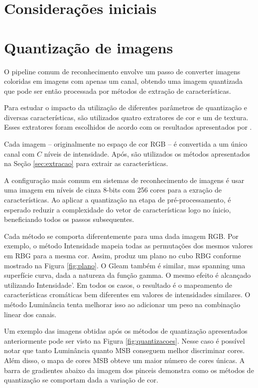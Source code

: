 \section{Considerações iniciais}


\section{Quantização de imagens}

O pipeline comum de reconhecimento envolve um passo de converter imagens coloridas em imagens com apenas um canal, obtendo uma imagem quantizada que pode ser então processada por métodos de extração de características.

Para estudar o impacto da utilização de diferentes parâmetros de quantização e diversas características, são utilizados quatro extratores de cor e um de textura. Esses extratores foram escolhidos de acordo com os resultados apresentados por .

Cada imagem -- originalmente no espaço de cor RGB -- é convertida a um único canal com $C$ níveis de intensidade. Após, são utilizados os métodos apresentados na Seção \ref{sec:extracao} para extrair as características.

A configuração mais comum em sistemas de reconhecimento de imagens é usar uma imagem em níveis de cinza 8-bits com 256 cores para a exração de características. Ao aplicar a quantização na etapa de pré-processamento, é esperado reduzir a complexidade do vetor de características logo no ínicio, beneficiando todos os passos subsequentes.

Cada método se comporta diferentemente para uma dada imagem RGB. Por exemplo, o método Intensidade mapeia todas as permutações dos mesmos valores em RBG para a mesma cor. Assim, produz um plano no cubo RBG conforme mostrado na Figura \ref{fig:plano}. O Gleam também é similar, mas spanning uma superfície curva, dada a natureza da função gamma. O mesmo efeito é alcançado utilizando Intensidade'. Em todos os casos, o resultado é o mapeamento de características cromáticas bem diferentes em valores de intensidades similares. O método Luminância tenta melhorar isso ao adicionar um peso na combinação linear dos canais.

Um exemplo das imagens obtidas após os métodos de quantização apresentados anteriormente pode ser visto na Figura \ref{fig:quantizacoes}. Nesse caso é possível notar que tanto Luminância quanto MSB conseguem melhor discriminar cores. Além disso, o mapa de cores MSB obteve um maior número de cores únicas. A barra de gradientes abaixo da imagem dos pinceis demonstra como os métodos de quantização se comportam dada a variação de cor.

